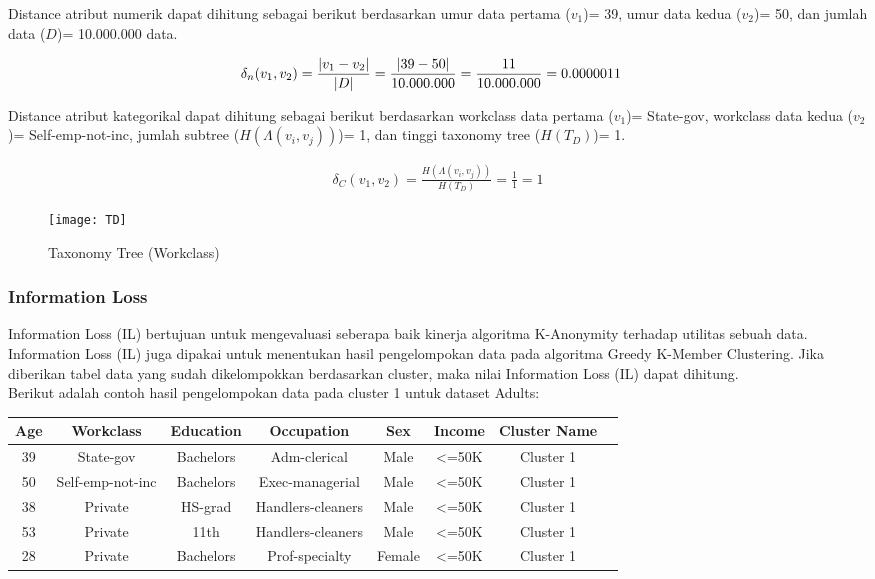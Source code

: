 \noindent Distance atribut numerik dapat dihitung sebagai berikut berdasarkan umur data pertama ($v_1$)= 39, umur data kedua ($v_2$)= 50, dan jumlah data ($D$)= 10.000.000 data.


\begin{align*}
\delta_n(v_1,v_2) &= \frac{|v_1 - v_2|}{|D|}
= \frac{|39 - 50|}{10.000.000}\vspace{0.2cm}
= \frac{11}{10.000.000}\vspace{0.2cm}
= 0.0000011
\end{align*}

\noindent Distance atribut kategorikal dapat dihitung sebagai berikut berdasarkan workclass data pertama ($v_1$)= State-gov, workclass data kedua ($v_2$)= Self-emp-not-inc, jumlah subtree ($H(\Lambda(v_i,v_j))$)= 1, dan tinggi taxonomy tree ($H(T_D)$)= 1.

\begin{align*}
\delta_C(v_1,v_2) = \frac{H(\Lambda(v_i,v_j))}{H(T_D)} 
= \frac{1}{1}
= 1
\end{align*}

\begin{figure}[H]
	\centering
	\texttt{[image: TD]}
	\caption{Taxonomy Tree (Workclass)}
	\label{fig:TD}
\end{figure}

\subsubsection{Information Loss}
Information Loss (IL) bertujuan untuk mengevaluasi seberapa baik kinerja algoritma K-Anonymity terhadap utilitas sebuah data. Information Loss (IL) juga dipakai untuk menentukan hasil pengelompokan data pada algoritma Greedy K-Member Clustering. Jika diberikan tabel data yang sudah dikelompokkan berdasarkan cluster, maka nilai Information Loss (IL) dapat dihitung. \\

\newpage
\noindent Berikut adalah contoh hasil pengelompokan data pada cluster 1 untuk dataset Adults:\\

\begin{tabular}{c c c c c c c c}
\hline 
Age & Workclass & Education & Occupation & Sex & Income & Cluster Name \\ 
\hline 
39 & State-gov & Bachelors & Adm-clerical & Male & <=50K & Cluster 1 \\ 

50 & Self-emp-not-inc & Bachelors & Exec-managerial & Male & <=50K & Cluster 1 \\ 

38 & Private & HS-grad & Handlers-cleaners & Male & <=50K & Cluster 1 \\ 

53 & Private & 11th & Handlers-cleaners & Male & <=50K & Cluster 1 \\ 
 
28 & Private & Bachelors & Prof-specialty & Female & <=50K & Cluster 1 \\ 
\hline 
\end{tabular} 

